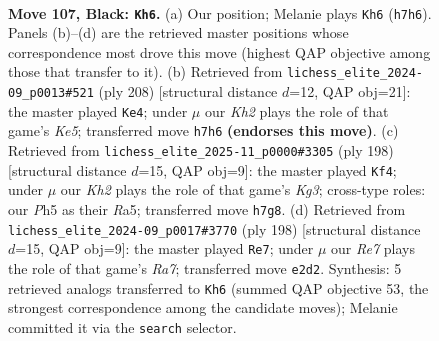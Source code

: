 \documentclass[11pt]{article}
\begin{document}
\clearpage

\begin{figure}[p]\centering
\begin{subfigure}{0.46\textwidth}\centering
\resizebox{\linewidth}{!}{%
\newchessgame
\chessboard[
  setfen={8/6pk/1N3p2/7p/7P/5RPK/4r3/8 b - - 39 107},
  showmover=false,
  pgfstyle=straightmove, color=movearrow, markmove={h7-h6}
]}
\caption{}
\end{subfigure}\hfill
\begin{subfigure}{0.46\textwidth}\centering
\resizebox{\linewidth}{!}{%
\newchessgame
\chessboard[
  setfen={8/2R5/6pk/4K2p/7P/1r3PP1/8/8 w - - 19 105},
  showmover=false,
  pgfstyle=straightmove, color=movearrow, markmove={e5-e4}
]}
\caption{}
\end{subfigure}
\\[4pt]
\begin{subfigure}{0.46\textwidth}\centering
\resizebox{\linewidth}{!}{%
\newchessgame
\chessboard[
  setfen={8/6pk/1r5p/R6P/6P1/6K1/8/8 w - - 55 100},
  showmover=false,
  pgfstyle=straightmove, color=movearrow, markmove={g3-f4}
]}
\caption{}
\end{subfigure}\hfill
\begin{subfigure}{0.46\textwidth}\centering
\resizebox{\linewidth}{!}{%
\newchessgame
\chessboard[
  setfen={8/R7/6pk/3r3p/7P/6PK/8/8 w - - 36 100},
  showmover=false,
  pgfstyle=straightmove, color=movearrow, markmove={a7-e7}
]}
\caption{}
\end{subfigure}
\caption{\textbf{Move 107, Black: \texttt{Kh6}.} (a) Our position; Melanie plays \texttt{Kh6} (\texttt{h7h6}). Panels (b)--(d) are the retrieved master positions whose correspondence most drove this move (highest QAP objective among those that transfer to it). (b) Retrieved from \texttt{lichess\_elite\_2024-09\_p0013\#521} (ply 208) [structural distance $d$=12, QAP obj=21]: the master played \texttt{Ke4}; under $\mu$ our \emph{Kh2} plays the role of that game's \emph{Ke5}; transferred move \texttt{h7h6} \textbf{(endorses this move)}. (c) Retrieved from \texttt{lichess\_elite\_2025-11\_p0000\#3305} (ply 198) [structural distance $d$=15, QAP obj=9]: the master played \texttt{Kf4}; under $\mu$ our \emph{Kh2} plays the role of that game's \emph{Kg3}; cross-type roles: our \emph{P}h5 as their \emph{R}a5; transferred move \texttt{h7g8}. (d) Retrieved from \texttt{lichess\_elite\_2024-09\_p0017\#3770} (ply 198) [structural distance $d$=15, QAP obj=9]: the master played \texttt{Re7}; under $\mu$ our \emph{Re7} plays the role of that game's \emph{Ra7}; transferred move \texttt{e2d2}. Synthesis: 5 retrieved analogs transferred to \texttt{Kh6} (summed QAP objective 53, the strongest correspondence among the candidate moves); Melanie committed it via the \texttt{search} selector.}
\label{fig:thought-m213}
\end{figure}
\end{document}
